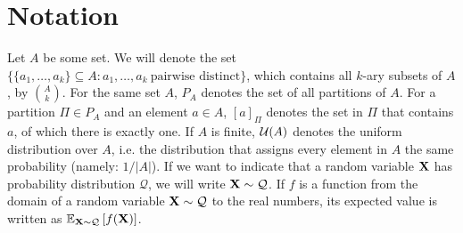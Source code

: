 \section{Notation}
Let $A$ be some set. We will denote the set $\{ \{ a_1, \dots, a_k \} \subseteq A : a_1,\dots,a_k\ \text{pairwise distinct}\}$, which contains all $k$-ary subsets of $A$, by $\binom{A}{k}$. For the same set $A$, $P_A$ denotes the set of all partitions of $A$. For a partition $\Pi \in P_A$ and an element $a \in A$, $[a]_\Pi$ denotes the set in $\Pi$ that contains $a$, of which there is exactly one. If $A$ is finite, $\mathcal{U}(A)$ denotes the uniform distribution over $A$, i.e. the distribution that assigns every element in $A$ the same probability (namely: $1/|A|$). If we want to indicate that a random variable ${\bf X}$ has probability distribution $\mathcal{Q}$, we will write ${\bf X} \sim \mathcal{Q}$. If $f$ is a function from the domain of a random variable ${\bf X} \sim \mathcal{Q}$ to the real numbers, its expected value is written as $\mathbb{E}_{{\bf X} \sim \mathcal{Q}}\left[f({\bf X})\right]$.  

